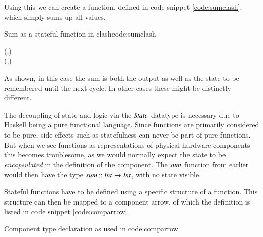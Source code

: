Using this we can create a function, defined in code snippet \ref{code:sumclash}, which simply sums up all values.

\begin{texexptitled}{Sum as a stateful function in \gls{clash}}{code:sumclash}
\begin{hscode}\SaveRestoreHook
{}%
%
%
\>[B]{}\mathbin{::}\to {}\to (,){}\<[E]%
\\
\>[B]{}\;\;\mathrel{=}(,){}\<[E]%
\\
\>[B]{}\<[5]%
\>[5]{}\;\mathrel{=}\mathbin{+}\<[E]%
\ColumnHook
\end{hscode}\resethooks
\end{texexptitled}

As shown, in this case the sum is both the output as well as the state to be remembered until the next cycle.
In other cases these might be distinctly different. 

The decoupling of state and logic via the \ensuremath{\Conid{State}} datatype is necessary due to Haskell being a pure functional language. 
Since functions are primarily considered to be pure, side-effects such as statefulness can never be part of pure functions.
But when we see functions as representations of physical hardware components this becomes troublesome, as we would normally expect the state to be \textit{encapsulated} in the definition of the component.
The \ensuremath{\Varid{sum}} function from earlier would then have the type \ensuremath{\Varid{sum}\mathbin{::}\Conid{Int}\to \Conid{Int}}, with no state visible.

Stateful functions have to be defined using a specific structure of a function.
This structure can then be mapped to a component arrow, of which the definition is listed in code snippet \ref{code:comparrow}.
\begin{texexptitled}{Component type declaration as used in \cite{gerards2011higher}}{code:comparrow}
\resethooks
\end{texexptitled}

